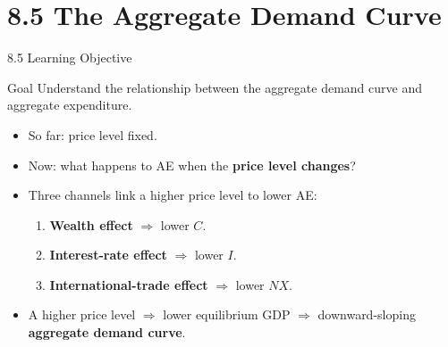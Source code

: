\documentclass[aspectratio=169]{beamer}
\begin{document}
\section{8.5 The Aggregate Demand Curve}

\begin{frame}{8.5 Learning Objective}
\transfade
\begin{block}{Goal}
Understand the relationship between the aggregate demand curve and aggregate expenditure.
\end{block}
\begin{itemize}[<+->]
  \item So far: price level fixed.
  \item Now: what happens to AE when the \textbf{price level changes}?
  \item Three channels link a higher price level to lower AE:
  \begin{enumerate}[<+->]
    \item \textbf{Wealth effect} $\Rightarrow$ lower $C$.
    \item \textbf{Interest-rate effect} $\Rightarrow$ lower $I$.
    \item \textbf{International-trade effect} $\Rightarrow$ lower $NX$.
  \end{enumerate}
  \item A higher price level $\Rightarrow$ lower equilibrium GDP $\Rightarrow$ downward-sloping \textbf{aggregate demand curve}.
\end{itemize}
\end{frame}
\end{document}
